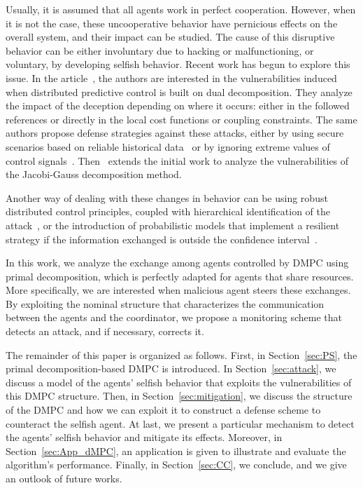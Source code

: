 \documentclass[a4paper, 10 pt, conference]{ieeeconf}  %
\begin{document}
Usually, it is assumed that all agents work in perfect cooperation.
However, when it is not the case, these uncooperative behavior have pernicious effects on the overall system, and their impact can be studied.
The cause of this disruptive behavior can be either involuntary due to hacking or malfunctioning, or voluntary, by developing selfish behavior.
Recent work has begun to explore this issue.
In the article~\cite{VelardeEtAl2017}, the authors are interested in the vulnerabilities induced when distributed predictive control is built on dual decomposition.
They analyze the impact of the deception depending on where it occurs: either in the followed references or directly in the local cost functions or coupling constraints.
The same authors propose defense strategies against these attacks, either by using secure scenarios based on reliable historical data~\cite{VelardeEtAl2017a} or by ignoring extreme values of control signals~\cite{VelardeEtAl2017}.
Then~\cite{ChanfreutEtAl2018} extends the initial work to analyze the vulnerabilities of the Jacobi-Gauss decomposition method.

Another way of dealing with these changes in behavior can be using robust distributed control principles, coupled with hierarchical identification of the attack~\cite{BraunEtAl2020}, or the introduction of probabilistic models that implement a resilient strategy if the information exchanged is outside the confidence interval~\cite{AnandutaEtAl2020}.


In this work, we analyze the exchange among agents controlled by DMPC using primal decomposition, which is perfectly adapted for agents that share resources.
More specifically, we are interested when malicious agent steers these exchanges.
By exploiting the nominal structure that characterizes the communication between the agents and the coordinator, we propose a monitoring scheme that detects an attack, and if necessary, corrects it.


The remainder of this paper is organized as follows.
First, in Section~\ref{sec:PS}, the primal decomposition-based DMPC is introduced.
In Section~\ref{sec:attack}, we discuss a model of the agents' selfish behavior that exploits the vulnerabilities of this DMPC structure.
Then, in Section~\ref{sec:mitigation}, we discuss the structure of the DMPC and how we can exploit it to construct a defense scheme to counteract the selfish agent.
At last, we present a particular mechanism to detect the agents' selfish behavior and mitigate its effects.
Moreover, in Section~\ref{sec:App_dMPC}, an application is given to illustrate and evaluate the algorithm's performance.
Finally, in Section~\ref{sec:CC}, we conclude, and we give an outlook of future works.
\end{document}
